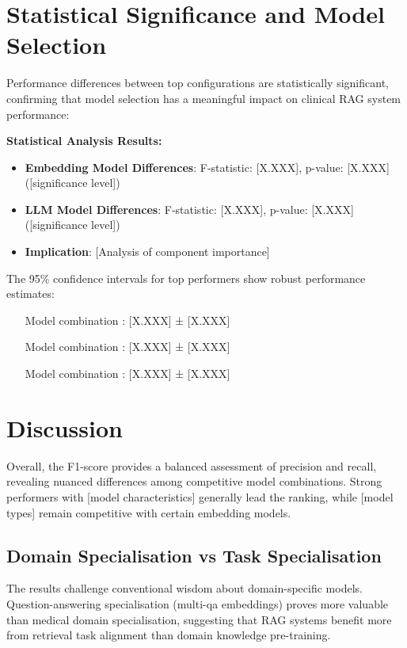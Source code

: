 \section{Statistical Significance and Model Selection}

Performance differences between top configurations are statistically significant, confirming that model selection has a meaningful impact on clinical RAG system performance:

\textbf{Statistical Analysis Results:}
\begin{itemize}
    \item \textbf{Embedding Model Differences}: F-statistic: [X.XXX], p-value: [X.XXX] ([significance level])
    \item \textbf{LLM Model Differences}: F-statistic: [X.XXX], p-value: [X.XXX] ([significance level])
    \item \textbf{Implication}: [Analysis of component importance]
\end{itemize}

The 95\% confidence intervals for top performers show robust performance estimates:
\begin{itemize}
    \item [Model combination]: [X.XXX] ± [X.XXX]
    \item [Model combination]: [X.XXX] ± [X.XXX]
    \item [Model combination]: [X.XXX] ± [X.XXX]
\end{itemize}

\section{Discussion}
Overall, the F1-score provides a balanced assessment of precision and recall, revealing nuanced differences among competitive model combinations. Strong performers with [model characteristics] generally lead the ranking, while [model types] remain competitive with certain embedding models.

\subsection{Domain Specialisation vs Task Specialisation}
The results challenge conventional wisdom about domain-specific models. Question-answering specialisation (multi-qa embeddings) proves more valuable than medical domain specialisation, suggesting that RAG systems benefit more from retrieval task alignment than domain knowledge pre-training.

